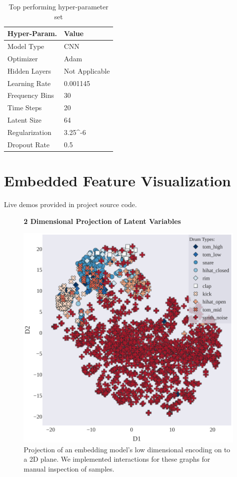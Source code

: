 \documentclass[runningheads,a4paper]{llncs}
\begin{document}
\begin{appendices}
\begin{table}[htbp!]
\centering
\begin{tabular}{|p{6cm}|p{6cm}|}
\hline
Hyper-Param. & Value  \\ \hline
Model Type      &  CNN  \\ \hline
Optimizer       & Adam  \\ \hline
Hidden Layers   & Not Applicable  \\\hline
Learning Rate   &  0.001145\\ \hline
Frequency Bins & 30 \\ \hline
Time Steps & 20 \\ \hline
Latent Size & 64 \\ \hline
Regularization & 3.25^{-6}\\ \hline
Dropout Rate & 0.5 \\ \hline
\end{tabular}
\caption{Top performing hyper-parameter set}
\label{table:best_params}
\end{table}


\chapter{Embedded Feature Visualization}
Live demos provided in project source code.
\label{appendix:E}
\begin{figure}[]
\centering
\textbf{2 Dimensional Projection of Latent Variables}\par\medskip
 \includegraphics[width=0.90\linewidth]{images/t-SNE_2d.pdf}
\caption{Projection of an embedding model's low dimensional encoding on to a 2D plane. We implemented interactions for these graphs for manual inspection of samples. }
\label{fig:2d_tsne}
\end{figure}


\end{appendices}
\end{document}
